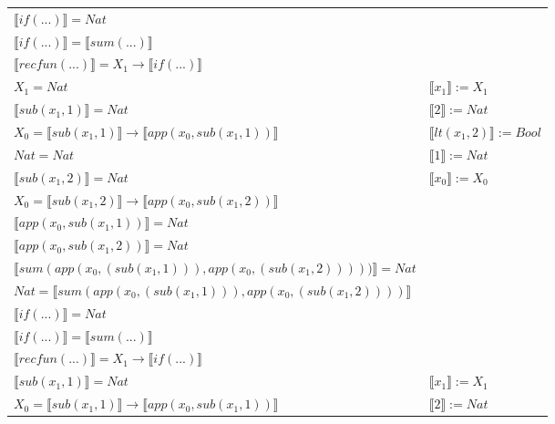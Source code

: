 \begin{exercise}
\begin{description}
\begin{center}
\begin{longtable}[!h]{ | l | l | }
                        $ \llbracket if(...) \rrbracket = Nat$ & \\
                        $ \llbracket if(...) \rrbracket =  \llbracket sum(...) \rrbracket$ & \\
                        $ \llbracket recfun(...) \rrbracket =   X_1  \to  \llbracket if(...) \rrbracket $  & \\
                    \hline
                        $X_1 = Nat$ &  $ \llbracket x_1 \rrbracket := X_1$ \\
                        $ \llbracket sub(x_1,1) \rrbracket = Nat$ & $ \llbracket 2 \rrbracket := Nat$ \\
                        $X_0 =  \llbracket sub(x_1,1) \rrbracket \to  \llbracket app(x_0, sub(x_1,1)) \rrbracket$ &  $ \llbracket lt(x_1 , 2) \rrbracket := Bool$ \\
                        $Nat = Nat$ & $ \llbracket 1 \rrbracket := Nat$ \\
                        $ \llbracket sub(x_1,2) \rrbracket = Nat$ & $ \llbracket x_0 \rrbracket := X_0$ \\
                        $X_0 =  \llbracket sub(x_1,2) \rrbracket \to  \llbracket app(x_0, sub(x_1,2)) \rrbracket$ &  \\
                        $ \llbracket app(x_0, sub(x_1,1)) \rrbracket = Nat$ & \\
                        $ \llbracket app(x_0, sub(x_1,2)) \rrbracket = Nat$ & \\
                        $ \llbracket sum(app(x_0, (sub(x_1,1))), app(x_0, (sub(x_1,2)))) ) \rrbracket = Nat$ & \\
                        $Nat =  \llbracket sum(app(x_0, (sub(x_1,1))), app(x_0, (sub(x_1,2)))) \rrbracket$ & \\
                        $ \llbracket if(...) \rrbracket = Nat$ & \\
                        $ \llbracket if(...) \rrbracket =  \llbracket sum(...) \rrbracket$ & \\
                        $ \llbracket recfun(...) \rrbracket =   X_1  \to  \llbracket if(...) \rrbracket $ & \\
                    \hline 
                        $ \llbracket sub(x_1,1) \rrbracket = Nat$ &  $ \llbracket x_1 \rrbracket := X_1$ \\
                        $X_0 =  \llbracket sub(x_1,1) \rrbracket \to  \llbracket app(x_0, sub(x_1,1)) \rrbracket$ & $ \llbracket 2 \rrbracket := Nat$ \\

\end{longtable}
\end{center}
\end{description}
\end{exercise}
